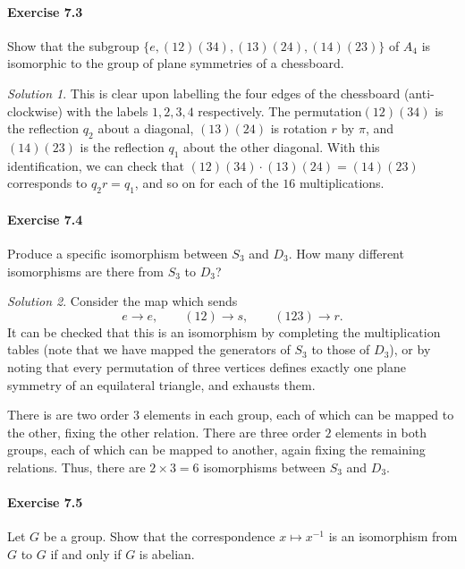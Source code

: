\documentclass[11pt]{report}
\theoremstyle{remark}
\newtheorem*{solution}{Solution}
\begin{document}
    \paragraph{Exercise 7.3} Show that the subgroup $\{e, (12)(34), (13)(24),
    (14)(23)\}$ of $A_4$ is isomorphic to the group of plane symmetries of a
    chessboard.
    \begin{solution}
        This is clear upon labelling the four edges of the chessboard
        (anti-clockwise) with the labels $1, 2, 3, 4$ respectively. The
        permutation$(12)(34)$ is the reflection $q_2$ about a diagonal, $(13)(24)$
        is rotation $r$ by $\pi$, and $(14)(23)$ is the reflection $q_1$ about the
        other diagonal. With this identification, we can check that $(12)(34) \cdot
        (13)(24) = (14)(23)$ corresponds to $q_2r = q_1$, and so on for each of the
        $16$ multiplications.
    \end{solution}

    \paragraph{Exercise 7.4} Produce a specific isomorphism between $S_3$ and $D_3$.
    How many different isomorphisms are there from $S_3$ to $D_3$?
    \begin{solution}
        Consider the map which sends \[
            e \to e, \qquad (12) \to s, \qquad (123) \to r.
        \] It can be checked that this is an isomorphism by completing the
        multiplication tables (note that we have mapped the generators of $S_3$ to
        those of $D_3$), or by noting that every permutation of three vertices
        defines exactly one plane symmetry of an equilateral triangle, and exhausts
        them.
        
        There is are two order $3$ elements in each group, each of which can be
        mapped to the other, fixing the other relation.
        There are three order $2$ elements in both groups, each of which can be
        mapped to another, again fixing the remaining relations.
        Thus, there are $2 \times 3 = 6$ isomorphisms between $S_3$ and $D_3$.
    \end{solution}
    
    \paragraph{Exercise 7.5} Let $G$ be a group. Show that the correspondence $x
    \mapsto x^{-1}$ is an isomorphism from $G$ to $G$ if and only if $G$ is abelian.
\end{document}
